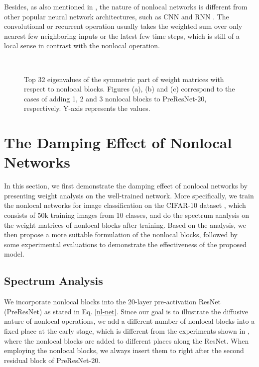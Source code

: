 \documentclass{article}
\begin{document}
Besides, as also mentioned in \cite{wang2017non}, the nature of nonlocal networks is different from other popular neural network architectures, such as CNN \cite{lecun1995convolutional} and RNN \cite{elman1991distributed}. The convolutional or recurrent operation usually takes the weighted sum over only nearest few neighboring inputs or the latest few time steps, which is still of a local sense in contrast with the nonlocal operation.



\begin{figure}
\centering
{}
\\
      \caption{Top 32 eigenvalues of the symmetric part of weight matrices with respect to nonlocal blocks. Figures (a), (b) and (c) correspond to the cases of adding 1, 2 and 3 nonlocal blocks to PreResNet-20, respectively. Y-axis represents the values.}
\label{fig:nl-old1}
\end{figure}



\section{The Damping Effect of Nonlocal Networks}\label{sec:model}
In this section, we first demonstrate the damping effect of nonlocal networks by presenting weight analysis on the well-trained network. More specifically, we train the nonlocal networks for image classification on the CIFAR-10 dataset \cite{krizhevsky2009learning}, which consists of 50k training images from 10 classes, and do the spectrum analysis on the weight matrices of nonlocal blocks after training. Based on the analysis, we then propose a more suitable formulation of the nonlocal blocks, followed by some experimental evaluations to demonstrate the effectiveness of the proposed model.

\subsection{Spectrum Analysis}
We incorporate nonlocal blocks into the 20-layer pre-activation ResNet (PreResNet) \cite{he2016identity} as stated in Eq. \eqref{nl-net}. Since our goal is to illustrate the diffusive nature of nonlocal operations, we add a different number of nonlocal blocks into a fixed place at the early stage, which is different from the experiments shown in \cite{wang2017non}, where the nonlocal blocks are added to different places along the ResNet. When employing the nonlocal blocks, we always insert them to right after the second residual block of PreResNet-20.
\end{document}
